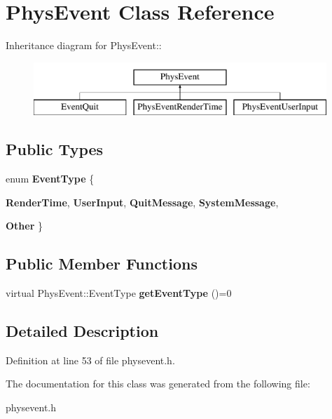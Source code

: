 \hypertarget{classPhysEvent}{
\section{PhysEvent Class Reference}
\label{d9/dc2/classPhysEvent}
}
Inheritance diagram for PhysEvent::\begin{figure}[H]
\begin{center}
\leavevmode
\includegraphics[height=2cm]{d9/dc2/classPhysEvent}
\end{center}
\end{figure}
\subsection*{Public Types}
\begin{DoxyCompactItemize}
\item 
enum {\bfseries EventType} \{ \par
{\bfseries RenderTime}, 
{\bfseries UserInput}, 
{\bfseries QuitMessage}, 
{\bfseries SystemMessage}, 
\par
{\bfseries Other}
 \}
\end{DoxyCompactItemize}
\subsection*{Public Member Functions}
\begin{DoxyCompactItemize}
\item 
\hypertarget{classPhysEvent_a23e053ac5e5e8475215e42c34ea6bf78}{
virtual PhysEvent::EventType {\bfseries getEventType} ()=0}
\label{d9/dc2/classPhysEvent_a23e053ac5e5e8475215e42c34ea6bf78}

\end{DoxyCompactItemize}


\subsection{Detailed Description}


Definition at line 53 of file physevent.h.

The documentation for this class was generated from the following file:\begin{DoxyCompactItemize}
\item 
physevent.h\end{DoxyCompactItemize}
